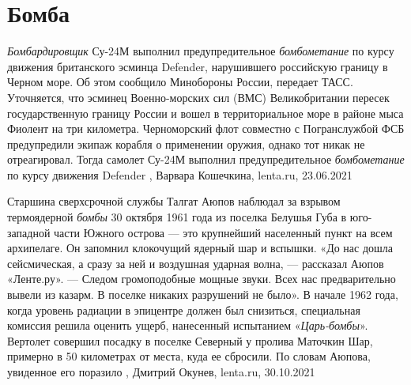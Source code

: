  
 
 
 
 
\chapter{Бомба}
\label{sec:slova.bomba}

\emph{Бомбардировщик} Су-24М выполнил предупредительное \emph{бомбометание} по курсу движения
британского эсминца Defender, нарушившего российскую границу в Черном море. Об
этом сообщило Минобороны России, передает ТАСС.  Уточняется, что эсминец
Военно-морских сил (ВМС) Великобритании пересек государственную границу России
и вошел в территориальное море в районе мыса Фиолент на три километра.
Черноморский флот совместно с Погранслужбой ФСБ предупредили экипаж корабля о
применении оружия, однако тот никак не отреагировал. Тогда самолет Су-24М
выполнил предупредительное \emph{бомбометание} по курсу движения Defender
, 
Варвара Кошечкина, lenta.ru, 23.06.2021

Старшина сверхсрочной службы Талгат Аюпов наблюдал за взрывом термоядерной
\emph{бомбы} 30 октября 1961 года из поселка Белушья Губа в юго-западной части
Южного острова — это крупнейший населенный пункт на всем архипелаге. Он
запомнил клокочущий ядерный шар и вспышки.  «До нас дошла сейсмическая, а сразу
за ней и воздушная ударная волна, — рассказал Аюпов «Ленте.ру». — Следом
громоподобные мощные звуки. Всех нас предварительно вывели из казарм. В поселке
никаких разрушений не было».  В начале 1962 года, когда уровень радиации в
эпицентре должен был снизиться, специальная комиссия решила оценить ущерб,
нанесенный испытанием «\emph{Царь-бомбы}».  Вертолет совершил посадку в поселке
Северный у пролива Маточкин Шар, примерно в 50 километрах от места, куда ее
сбросили. По словам Аюпова, увиденное его поразило
, Дмитрий Окунев, lenta.ru, 30.10.2021
